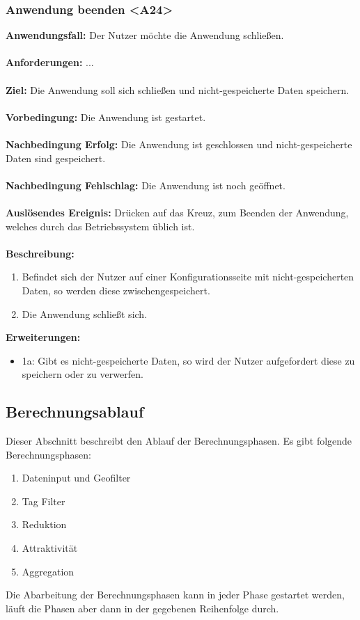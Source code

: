 \documentclass[parskip=full]{scrartcl} %
\begin{document}
\subsubsection*{Anwendung beenden <A24>}
\textbf{Anwendungsfall:} Der Nutzer möchte die Anwendung schließen.\\\\
\textbf{Anforderungen:} ...\\\\
\textbf{Ziel:} Die Anwendung soll sich schließen und nicht-gespeicherte Daten speichern. \\\\
\textbf{Vorbedingung:} Die Anwendung ist gestartet.\\\\
\textbf{Nachbedingung Erfolg:} Die Anwendung ist geschlossen und nicht-gespeicherte Daten sind gespeichert.\\\\
\textbf{Nachbedingung Fehlschlag:} Die Anwendung ist noch geöffnet.\\\\
\textbf{Auslösendes Ereignis:} Drücken auf das Kreuz, zum Beenden der Anwendung, welches durch das Betriebssystem üblich ist. \\\\
\textbf{Beschreibung:}
\begin{enumerate}
    \item Befindet sich der Nutzer auf einer Konfigurationsseite mit nicht-gespeicherten Daten, so werden diese zwischengespeichert.
    \item Die Anwendung schließt sich.
\end{enumerate}
\textbf{Erweiterungen:} 
\begin{itemize}
    \item 1a: Gibt es nicht-gespeicherte Daten, so wird der Nutzer aufgefordert diese zu speichern oder zu verwerfen.
\end{itemize}
\newpage







\subsection{Berechnungsablauf} \hypertarget{calculations}{}
Dieser Abschnitt beschreibt den Ablauf der Berechnungsphasen. Es gibt folgende Berechnungsphasen:
\begin{enumerate}
    \item Dateninput und Geofilter
    \item Tag Filter
    \item Reduktion
    \item Attraktivität
    \item Aggregation
\end{enumerate}
Die Abarbeitung der Berechnungsphasen kann in jeder Phase gestartet werden, läuft die Phasen aber dann in der gegebenen Reihenfolge durch.
\end{document}
